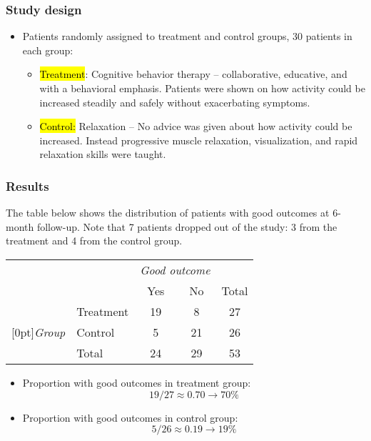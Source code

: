 \documentclass[slidestop,compress,mathserif]{beamer}
\begin{document}
\begin{frame}
\frametitle{Study design}

\begin{itemize}

\item Patients randomly assigned to treatment and control groups, 30 patients in each group:
\begin{itemize}
\item \hl{Treatment}: Cognitive behavior therapy -- collaborative, educative, and with a behavioral emphasis. Patients were shown on how activity could be increased steadily and safely without exacerbating symptoms.
\item \hl{Control:} Relaxation -- No advice was given about how activity could be increased. Instead progressive muscle relaxation, visualization, and rapid relaxation skills were taught.
\end{itemize}

\end{itemize}

\end{frame}


\begin{frame}
\frametitle{Results}

The table below shows the distribution of patients with good outcomes at 6-month follow-up. Note that 7 patients dropped out of the study: 3 from the treatment and 4 from the control group.

\begin{center}
\begin{tabular}{ll  cc c} 
			&				& \multicolumn{2}{c}{\textit{Good outcome}} \\
\cline{3-4}
			&							& Yes 	& No 	& Total	\\
\cline{2-5}
							&Treatment 	& 19	 	& 8		& 27 	\\
\raisebox{1.5ex}[0pt]{\textit{Group}}	&Control		& 5	 	& 21	 	& 26 \\
\cline{2-5}
							&Total		& 24		& 29		& 53
\end{tabular}
\end{center}

\pause

\begin{itemize}

\item Proportion with good outcomes in treatment group:
\[ 19 / 27 \approx 0.70 \rightarrow 70\% \]

\pause

\item Proportion with good outcomes in control group:
\[ 5 / 26 \approx 0.19 \rightarrow 19\% \]

\end{itemize}

\end{frame}
\end{document}
